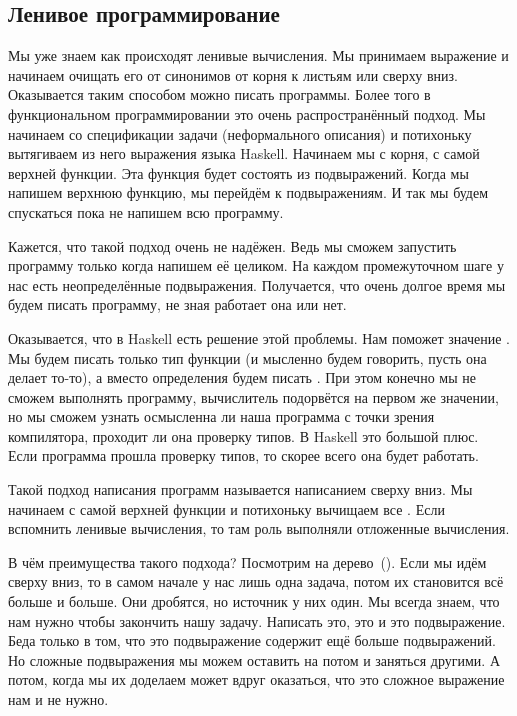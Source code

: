 \subsection{Ленивое программирование}

Мы уже знаем как происходят ленивые вычисления. Мы принимаем выражение и
начинаем очищать его от синонимов от корня к листьям или сверху вниз.
Оказывается таким способом можно писать программы. Более того в
функциональном программировании это очень распространённый подход. Мы
начинаем со спецификации задачи (неформального описания) и потихоньку
вытягиваем из него выражения языка Haskell. Начинаем мы с корня, с самой
верхней функции. Эта функция будет состоять из подвыражений. Когда мы
напишем верхнюю функцию, мы перейдём к подвыражениям. И так мы будем
спускаться пока не напишем всю программу.

Кажется, что такой подход очень не надёжен. Ведь мы сможем запустить
программу только когда напишем её целиком. На каждом промежуточном шаге
у нас есть неопределённые подвыражения. Получается, что очень долгое
время мы будем писать программу, не зная работает она или нет.

Оказывается, что в Haskell есть решение этой проблемы. Нам поможет
значение . Мы будем писать только тип функции (и мысленно
будем говорить, пусть она делает то-то), а вместо определения будем
писать . При этом конечно мы не сможем выполнять
программу, вычислитель подорвётся на первом же значении, но мы сможем
узнать осмысленна ли наша программа с точки зрения компилятора, проходит
ли она проверку типов. В Haskell это большой плюс. Если программа прошла
проверку типов, то скорее всего она будет работать.

Такой подход написания программ называется написанием сверху вниз. Мы
начинаем с самой верхней функции и потихоньку вычищаем все
. Если вспомнить ленивые вычисления, то там роль
 выполняли отложенные вычисления.

В чём преимущества такого подхода? Посмотрим на
дерево~(). Если мы идём сверху вниз, то в самом начале
у нас лишь одна задача, потом их становится всё больше и больше. Они
дробятся, но источник у них один. Мы всегда знаем, что нам нужно чтобы
закончить нашу задачу. Написать это, это и это подвыражение. Беда только
в том, что это подвыражение содержит ещё больше подвыражений. Но сложные
подвыражения мы можем оставить на потом и заняться другими. А потом,
когда мы их доделаем может вдруг оказаться, что это сложное выражение
нам и не нужно.

